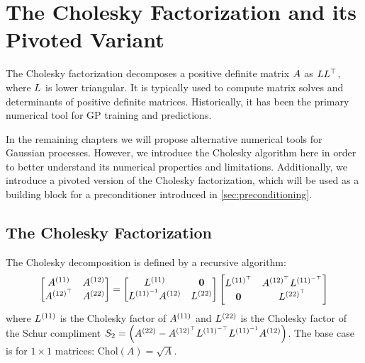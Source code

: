 \section{The Cholesky Factorization and its Pivoted Variant}

The Cholesky factorization decomposes a positive definite matrix $A$ as $L L^{\top}$, where $L$ is lower triangular.
It is typically used to compute matrix solves and determinants of positive definite matrices.
Historically, it has been the primary numerical tool for GP training and predictions.

In the remaining chapters we will propose alternative numerical tools for Gaussian processes.
However, we introduce the Cholesky algorithm here in order to better understand its numerical properties and limitations.
Additionally, we introduce a pivoted version of the Cholesky factorization, which will be used as a building block for a preconditioner introduced in \cref{sec:preconditioning}.

\subsection{The Cholesky Factorization}
%
The Cholesky decomposition is defined by a recursive algorithm:
%
\begin{equation}
 \label{eqn:cholesky_full}
 \begin{bmatrix} A^{(11)} & A^{(12)} \\ A^{(12)^\top} & A^{(22)}\end{bmatrix}
 =
 \begin{bmatrix} L^{(11)} & \mathbf{0} \\ L^{(11)^{-1}} A^{(12)} & L^{(22)}\end{bmatrix}
 \begin{bmatrix} L^{(11)^\top} & A^{(12)^\top} L^{(11)^{-\top}} \\ \mathbf{0} & L^{(22)^\top}\end{bmatrix}
\end{equation}
%
where $L^{(11)}$ is the Cholesky factor of $A^{(11)}$ and $L^{(22)}$ is the Cholesky factor of the Schur compliment $S_2 = \left( A^{(22)} - A^{(12)^\top} L^{(11)^{-\top}} L^{(11)^{-1}} A^{(12)} \right)$.
The base case is for $1 \times 1$ matrices: $\text{Chol}(A) = \sqrt{A}$.


